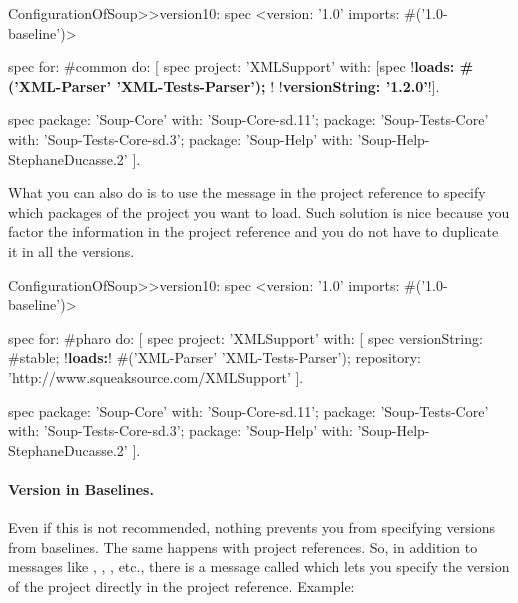 \documentclass[a4paper,10pt,twoside]{book}
\begin{document}
\begin{code}{}
ConfigurationOfSoup>>version10: spec 
	<version: '1.0' imports:  #('1.0-baseline')>
	 
	spec for: #common do: [	
		spec 
			project: 'XMLSupport' 
			with: [spec 
						!\textbf{loads: \#('XML-Parser' 'XML-Tests-Parser'); }!
						!\textbf{versionString: '1.2.0'}!].
	
		spec 
			package: 'Soup-Core' with: 'Soup-Core-sd.11'; 
			package: 'Soup-Tests-Core' with: 'Soup-Tests-Core-sd.3';
			package: 'Soup-Help' with: 'Soup-Help-StephaneDucasse.2' ].
\end{code}


 What you can also do is to use the  message in the project reference to specify which packages of the project you want to load. Such solution is nice because you factor the information in the project reference and you do not have to duplicate it in all the versions.

\begin{code}{}
ConfigurationOfSoup>>version10: spec 
	<version: '1.0' imports:  #('1.0-baseline')>
	 
	spec for: #pharo do: [	
		spec project: 'XMLSupport' with: [
                       spec 
                          versionString: #stable;
                          !\textbf{loads:}! #('XML-Parser' 'XML-Tests-Parser');
                          repository: 'http://www.squeaksource.com/XMLSupport' ].

	spec 
			package: 'Soup-Core' with: 'Soup-Core-sd.11'; 
			package: 'Soup-Tests-Core' with: 'Soup-Tests-Core-sd.3';
			package: 'Soup-Help' with: 'Soup-Help-StephaneDucasse.2' ].
\end{code}



\paragraph{Version in Baselines.} Even if this is not recommended, nothing prevents you from specifying versions from baselines. The same happens with project references. So, in addition to messages like , , , etc., there is a message called  which lets you specify the version of the project directly in the project reference. Example:
\end{document}
